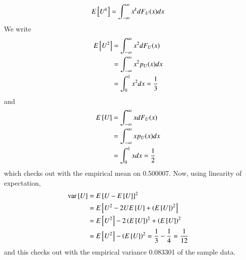 \documentclass[journal,12pt,twocolumn]{IEEEtran}
\begin{document}
%
\begin{equation}
E{}\left[U^k\right] = \int_{-\infty}^{\infty}x^kdF_{U}(x)dx
\end{equation}
\solution
We write
\begin{align}
	E{}\left[U^2\right] &= \int_{-\infty}^{\infty}x^2dF_U(x) \\
	&= \int_{-\infty}^{\infty}x^2p_U(x)dx \\
	&= \int_{0}^{1}x^2dx = \frac{1}{3}
\end{align}
and
\begin{align}
	E{}\left[U\right] &= \int_{-\infty}^{\infty}xdF_U(x) \\
	&= \int_{-\infty}^{\infty}xp_U(x)dx \\
	&= \int_{0}^{1}xdx = \frac{1}{2}
\end{align}
which checks out with the empirical mean on 0.500007. Now, using linearity of expectation,
\begin{align}
	\text{var}{}\left[U\right] &= E{}\left[U - E{}\left[U\right]\right]^2 \\
	&= E{}\left[U^2 - 2UE{}\left[U\right] + \left(E{}\left[U\right]\right)^2\right] \\
	&= E{}\left[U^2\right] - 2\left(E{}\left[U\right]\right)^2 + \left(E{}\left[U\right]\right)^2 \\
	&= E{}\left[U^2\right] - \left(E{}\left[U\right]\right)^2 = \frac{1}{3} - \frac{1}{4} = \frac{1}{12} \\
\end{align}
and this checks out with the empirical variance 0.083301 of the sample data.
\end{document}
